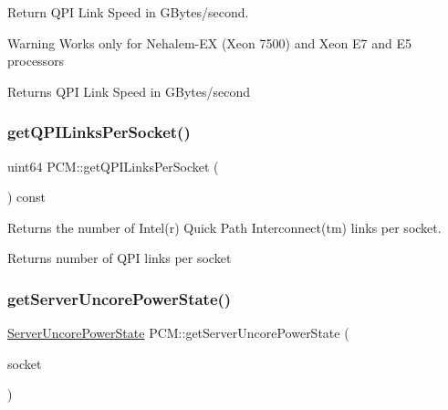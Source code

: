 Return Q\+PI Link Speed in G\+Bytes/second. 

\begin{DoxyWarning}{Warning}
Works only for Nehalem-\/\+EX (Xeon 7500) and Xeon E7 and E5 processors 
\end{DoxyWarning}
\begin{DoxyReturn}{Returns}
Q\+PI Link Speed in G\+Bytes/second 
\end{DoxyReturn}
\mbox{\label{class_p_c_m_af0f62775b214218edf64a3f68df6c932}} 
\subsubsection{\texorpdfstring{get\+Q\+P\+I\+Links\+Per\+Socket()}{getQPILinksPerSocket()}}
{\footnotesize\ttfamily uint64 P\+C\+M\+::get\+Q\+P\+I\+Links\+Per\+Socket (\begin{DoxyParamCaption}{ }\end{DoxyParamCaption}) const\hspace{0.3cm}{\ttfamily [inline]}}



Returns the number of Intel(r) Quick Path Interconnect(tm) links per socket. 

\begin{DoxyReturn}{Returns}
number of Q\+PI links per socket 
\end{DoxyReturn}
\mbox{\label{class_p_c_m_a9db0d472d9cdc0aa3c6db8ed7bb38f77}} 
\subsubsection{\texorpdfstring{get\+Server\+Uncore\+Power\+State()}{getServerUncorePowerState()}}
{\footnotesize\ttfamily \mbox{\hyperlink{class_server_uncore_power_state}{Server\+Uncore\+Power\+State}} P\+C\+M\+::get\+Server\+Uncore\+Power\+State (\begin{DoxyParamCaption}\item[{uint32}]{socket }\end{DoxyParamCaption})}



